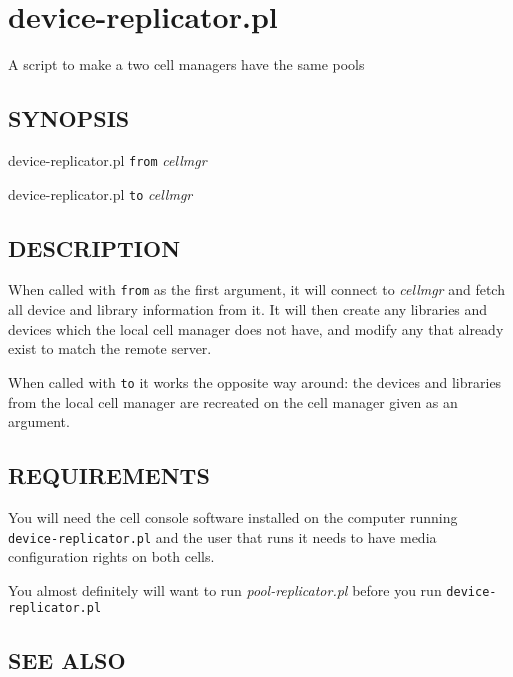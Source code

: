 \documentclass{article}
\begin{document}
\section{device-replicator.pl\label{device-replicator_pl}}


A script to make a two cell managers have the same pools

\subsection*{SYNOPSIS\label{device-replicator_pl_SYNOPSIS}}


device-replicator.pl \texttt{from} \textit{cellmgr}



device-replicator.pl \texttt{to} \textit{cellmgr}

\subsection*{DESCRIPTION\label{device-replicator_pl_DESCRIPTION}}


When called with \texttt{from} as the first argument, it will connect to
\textit{cellmgr} and fetch all device and library information from it. It
will then create any libraries and devices which the local cell
manager does not have, and modify any that already exist to match the
remote server.



When called with \texttt{to} it works the opposite way around: the devices and libraries
from the local cell manager are recreated on the cell manager given as an argument.

\subsection*{REQUIREMENTS\label{device-replicator_pl_REQUIREMENTS}}


You will need the cell console software installed on the computer running
\texttt{device-replicator.pl} and the user that runs it needs to have media configuration
rights on both cells.



You almost definitely will want to run \emph{pool-replicator.pl} before you run \texttt{device-replicator.pl}

\subsection*{SEE ALSO\label{device-replicator_pl_SEE_ALSO}}
\end{document}
